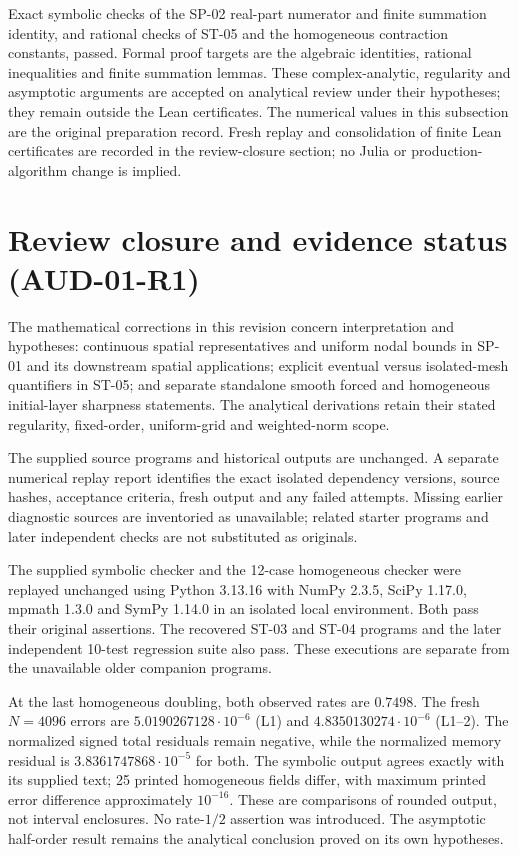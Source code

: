 \documentclass[11pt,a4paper]{amsart}
\theoremstyle{remark}
\theoremstyle{plain}
\theoremstyle{remark}
\numberwithin{equation}{section}
\begin{document}
Exact symbolic checks of the SP-02 real-part numerator and finite summation identity, and rational checks of ST-05 and the homogeneous contraction constants, passed. Formal proof targets are the algebraic identities, rational inequalities and finite summation lemmas. These complex-analytic, regularity and asymptotic arguments are accepted on analytical review under their hypotheses; they remain outside the Lean certificates. The numerical values in this subsection are the original preparation record. Fresh replay and consolidation of finite Lean certificates are recorded in the review-closure section; no Julia or production-algorithm change is implied.


\section{Review closure and evidence status (AUD-01-R1)}
\label{sec:aud01-review-closure}
The mathematical corrections in this revision concern interpretation and hypotheses: continuous spatial representatives and uniform nodal bounds in SP-01 and its downstream spatial applications; explicit eventual versus isolated-mesh quantifiers in ST-05; and separate standalone smooth forced and homogeneous initial-layer sharpness statements. The analytical derivations retain their stated regularity, fixed-order, uniform-grid and weighted-norm scope.

The supplied source programs and historical outputs are unchanged. A separate numerical replay report identifies the exact isolated dependency versions, source hashes, acceptance criteria, fresh output and any failed attempts. Missing earlier diagnostic sources are inventoried as unavailable; related starter programs and later independent checks are not substituted as originals.

The supplied symbolic checker and the 12-case homogeneous checker were replayed unchanged using Python 3.13.16 with NumPy 2.3.5, SciPy 1.17.0, mpmath 1.3.0 and SymPy 1.14.0 in an isolated local environment. Both pass their original assertions. The recovered ST-03 and ST-04 programs and the later independent 10-test regression suite also pass. These executions are separate from the unavailable older companion programs.

At the last homogeneous doubling, both observed rates are $0.7498$. The fresh $N=4096$ errors are $5.0190267128\cdot10^{-6}$ (L1) and $4.8350130274\cdot10^{-6}$ (L1--2). The normalized signed total residuals remain negative, while the normalized memory residual is $3.8361747868\cdot10^{-5}$ for both. The symbolic output agrees exactly with its supplied text; 25 printed homogeneous fields differ, with maximum printed error difference approximately $10^{-16}$. These are comparisons of rounded output, not interval enclosures. No rate-$1/2$ assertion was introduced. The asymptotic half-order result remains the analytical conclusion proved on its own hypotheses.
\end{document}
